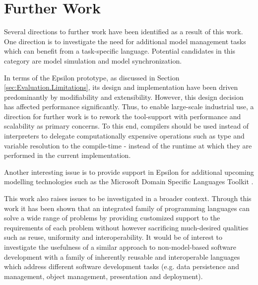 \section{Further Work}
\label{sec:Conclusions.FurtherWork}

Several directions to further work have been identified as a result of this work. One direction is to investigate the need for additional model management tasks which can benefit from a task-specific language. Potential candidates in this category are model simulation and model synchronization. 

In terms of the Epsilon prototype, as discussed in Section \ref{sec:Evaluation.Limitations}, its design and implementation have been driven predominantly by modifiability and extensibility. However, this design decision has affected performance significantly. Thus, to enable large-scale industrial use, a direction for further work is to rework the tool-support with performance and scalability as primary concerns. To this end, compilers should be used instead of interpreters to delegate computationally expensive operations such as type and variable resolution to the compile-time -  instead of the runtime at which they are performed in the current implementation. 

Another interesting issue is to provide support in Epsilon for additional upcoming modelling technologies such as the Microsoft Domain Specific Languages Toolkit \cite{MSDSL}.

This work also raises issues to be investigated in a broader context. Through this work it has been shown that an integrated family of programming languages can solve a wide range of problems by providing customized support to the requirements of each problem without however sacrificing much-desired qualities such as reuse, uniformity and interoperability. It would be of interest to investigate the usefulness of a similar approach to non-model-based software development with a family of inherently reusable and interoperable languages which address different software development tasks (e.g. data persistence and management, object management, presentation and deployment).